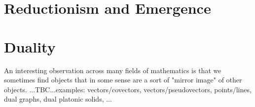 \section{Reductionism and Emergence}


%

\section{Duality}
An interesting observation across many fields of mathematics is that we sometimes find objects that in some sense are a sort of "mirror image" of other objects. ...TBC...examples: vectors/covectors, vectors/pseudovectors, points/lines, dual graphs, dual platonic solids, ...




%

